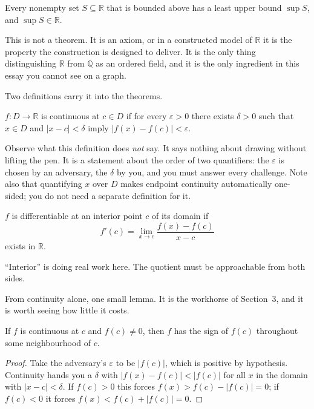 \documentclass{essay}
\begin{document}
\begin{axiom}[Completeness]
Every nonempty set $S \subseteq \mathbb{R}$ that is bounded above has a least upper bound $\sup S$, and $\sup S \in \mathbb{R}$.
\end{axiom}

This is not a theorem. It is an axiom, or in a constructed model of $\mathbb{R}$ it is the property the construction is designed to deliver. It is the only thing distinguishing $\mathbb{R}$ from $\mathbb{Q}$ as an ordered field, and it is the only ingredient in this essay you cannot see on a graph.

Two definitions carry it into the theorems.

\begin{definition}[Continuity]
$f : D \to \mathbb{R}$ is continuous at $c \in D$ if for every $\varepsilon > 0$ there exists $\delta > 0$ such that $x \in D$ and $|x - c| < \delta$ imply $|f(x) - f(c)| < \varepsilon$.
\end{definition}

Observe what this definition does \emph{not} say. It says nothing about drawing without lifting the pen. It is a statement about the order of two quantifiers: the $\varepsilon$ is chosen by an adversary, the $\delta$ by you, and you must answer every challenge. Note also that quantifying $x$ over $D$ makes endpoint continuity automatically one-sided; you do not need a separate definition for it.

\begin{definition}[Differentiability]
$f$ is differentiable at an interior point $c$ of its domain if
\[
f'(c) = \lim_{x \to c} \frac{f(x) - f(c)}{x - c}
\]
exists in $\mathbb{R}$.
\end{definition}

``Interior'' is doing real work here. The quotient must be approachable from both sides.

From continuity alone, one small lemma. It is the workhorse of Section~3, and it is worth seeing how little it costs.

\begin{lemma}\label{lem:sign}
If $f$ is continuous at $c$ and $f(c) \neq 0$, then $f$ has the sign of $f(c)$ throughout some neighbourhood of $c$.
\end{lemma}

\begin{proof}
Take the adversary's $\varepsilon$ to be $|f(c)|$, which is positive by hypothesis. Continuity hands you a $\delta$ with $|f(x) - f(c)| < |f(c)|$ for all $x$ in the domain with $|x-c| < \delta$. If $f(c) > 0$ this forces $f(x) > f(c) - |f(c)| = 0$; if $f(c) < 0$ it forces $f(x) < f(c) + |f(c)| = 0$.
\end{proof}
\end{document}
